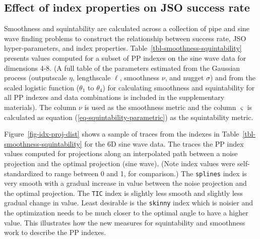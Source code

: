 \documentclass[
  12pt,
]{interact}
\theoremstyle{plain}
\begin{document}
\subsection{Effect of index properties on JSO success
rate}\label{effect-of-index-properties-on-jso-success-rate}

Smoothness and squintability are calculated across a collection of pipe
and sine wave finding problems to construct the relationship between
success rate, JSO hyper-parameters, and index properties.
Table~\ref{tbl-smoothness-squintability} presents values computed for a
subset of PP indexes on the sine wave data for dimensions 4-8. (A full
table of the parameters estimated from the Gaussian process (outputscale
\(\eta\), lengthscale \(\ell\), smoothness \(\nu\), and nugget
\(\sigma\)) and from the scaled logistic function (\(\theta_1\) to
\(\theta_4\)) for calculating smoothness and squintability for all PP
indexes and data combinations is included in the supplementary
materials). The column \(\nu\) is used as the smoothness metric and the
column \(\varsigma\) is calculated as equation
(\ref{eq-squintability-parametric}) as the squintability metric.

Figure~\ref{fig-idx-proj-dist} shows a sample of traces from the indexes
in Table~\ref{tbl-smoothness-squintability} for the 6D sine wave data.
The traces the PP index values computed for projections along an
interpolated path between a noise projection and the optimal projection
(sine wave). (Note index values were self-standardized to range between
0 and 1, for comparison.) The \texttt{splines} index is very smooth with
a gradual increase in value between the noise projection and the optimal
projection. The \texttt{TIC} index is slightly less smooth and slightly
less gradual change in value. Least desirable is the \texttt{skinny}
index which is noisier and the optimization needs to be much closer to
the optimal angle to have a higher value. This illustrates how the new
measures for squintability and smoothness work to describe the PP
indexes.
\end{document}
